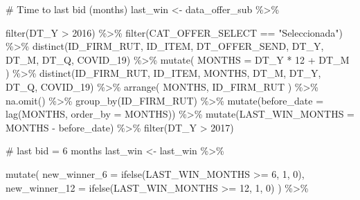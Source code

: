 \documentclass[
]{report}
\newenvironment{Shaded}{\begin{snugshade}}{\end{snugshade}}
\newcommand{\AttributeTok}[1]{\textcolor[rgb]{0.40,0.45,0.13}{#1}}
\newcommand{\CommentTok}[1]{\textcolor[rgb]{0.37,0.37,0.37}{#1}}
\newcommand{\DecValTok}[1]{\textcolor[rgb]{0.68,0.00,0.00}{#1}}
\newcommand{\FunctionTok}[1]{\textcolor[rgb]{0.28,0.35,0.67}{#1}}
\newcommand{\NormalTok}[1]{\textcolor[rgb]{0.00,0.23,0.31}{#1}}
\newcommand{\OtherTok}[1]{\textcolor[rgb]{0.00,0.23,0.31}{#1}}
\newcommand{\SpecialCharTok}[1]{\textcolor[rgb]{0.37,0.37,0.37}{#1}}
\newcommand{\StringTok}[1]{\textcolor[rgb]{0.13,0.47,0.30}{#1}}
\begin{document}
\begin{Shaded}
\begin{Highlighting}[]
\CommentTok{\# Time to last bid (months)}
\NormalTok{last\_win }\OtherTok{\textless{}{-}}\NormalTok{ data\_offer\_sub }\SpecialCharTok{\%\textgreater{}\%} 
  
  \FunctionTok{filter}\NormalTok{(DT\_Y }\SpecialCharTok{\textgreater{}} \DecValTok{2016}\NormalTok{) }\SpecialCharTok{\%\textgreater{}\%} 
  \FunctionTok{filter}\NormalTok{(CAT\_OFFER\_SELECT }\SpecialCharTok{==} \StringTok{"Seleccionada"}\NormalTok{) }\SpecialCharTok{\%\textgreater{}\%} 
  \FunctionTok{distinct}\NormalTok{(ID\_FIRM\_RUT, ID\_ITEM, DT\_OFFER\_SEND, DT\_Y, DT\_M, DT\_Q, COVID\_19) }\SpecialCharTok{\%\textgreater{}\%} 
  \FunctionTok{mutate}\NormalTok{(}
    \AttributeTok{MONTHS =}\NormalTok{ DT\_Y }\SpecialCharTok{*} \DecValTok{12} \SpecialCharTok{+}\NormalTok{ DT\_M}
\NormalTok{  ) }\SpecialCharTok{\%\textgreater{}\%} 
  \FunctionTok{distinct}\NormalTok{(ID\_FIRM\_RUT, ID\_ITEM, MONTHS, DT\_M, DT\_Y, DT\_Q, COVID\_19) }\SpecialCharTok{\%\textgreater{}\%} 
  \FunctionTok{arrange}\NormalTok{(}
\NormalTok{    MONTHS, ID\_FIRM\_RUT}
\NormalTok{  ) }\SpecialCharTok{\%\textgreater{}\%} 
  \FunctionTok{na.omit}\NormalTok{() }\SpecialCharTok{\%\textgreater{}\%} 
  \FunctionTok{group\_by}\NormalTok{(ID\_FIRM\_RUT) }\SpecialCharTok{\%\textgreater{}\%} 
  \FunctionTok{mutate}\NormalTok{(}\AttributeTok{before\_date =} \FunctionTok{lag}\NormalTok{(MONTHS, }\AttributeTok{order\_by =}\NormalTok{ MONTHS)) }\SpecialCharTok{\%\textgreater{}\%}  
  \FunctionTok{mutate}\NormalTok{(}\AttributeTok{LAST\_WIN\_MONTHS =}\NormalTok{ MONTHS }\SpecialCharTok{{-}}\NormalTok{ before\_date) }\SpecialCharTok{\%\textgreater{}\%} 
  \FunctionTok{filter}\NormalTok{(DT\_Y }\SpecialCharTok{\textgreater{}} \DecValTok{2017}\NormalTok{)}

\CommentTok{\# last bid = 6 months}
\NormalTok{last\_win }\OtherTok{\textless{}{-}}\NormalTok{ last\_win }\SpecialCharTok{\%\textgreater{}\%} 

  \FunctionTok{mutate}\NormalTok{(}
    \AttributeTok{new\_winner\_6  =} \FunctionTok{ifelse}\NormalTok{(LAST\_WIN\_MONTHS }\SpecialCharTok{\textgreater{}=} \DecValTok{6}\NormalTok{, }\DecValTok{1}\NormalTok{, }\DecValTok{0}\NormalTok{),}
    \AttributeTok{new\_winner\_12 =} \FunctionTok{ifelse}\NormalTok{(LAST\_WIN\_MONTHS }\SpecialCharTok{\textgreater{}=} \DecValTok{12}\NormalTok{, }\DecValTok{1}\NormalTok{, }\DecValTok{0}\NormalTok{)}
\NormalTok{    ) }\SpecialCharTok{\%\textgreater{}\%} 
  

\end{Highlighting}
\end{Shaded}
\end{document}
